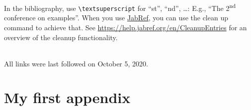 \documentclass[
  fontsize=10pt
  numbers=noenddot,
  english,  %
  paper=a5,
  twoside,  %
  DIV=calc,
  headings=small,
  bibliography=totoc,
  listof=totoc,
  draft=false
]{scrbook}
\theoremstyle{break}
\begin{document}
In the bibliography, use \texttt{\textbackslash textsuperscript} for \enquote{st}, \enquote{nd}, \ldots:
E.g., \enquote{The 2\textsuperscript{nd} conference on examples}.
When you use \href{https://www.jabref.org}{JabRef}, you can use the clean up command to achieve that.
See \url{https://help.jabref.org/en/CleanupEntries} for an overview of the cleanup functionality.

\printbibliography

\ \\
%
\noindent
All links were last followed on October 5, 2020.



\clearpage
\appendix

\chapter{My first appendix}\label{sec:appendix1}

\lipsum[1]

\pagestyle{empty}
\renewcommand*{\chapterpagestyle}{empty}
\end{document}
